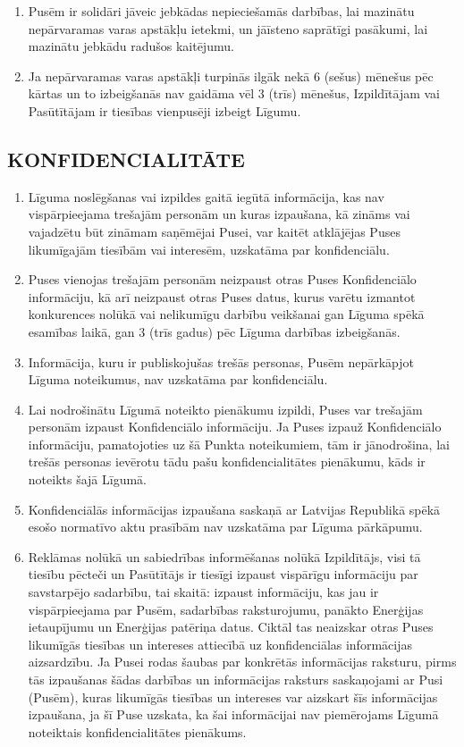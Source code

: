 \begin{multicols}{2}
\begin{enumerate}
	\item Pusēm ir solidāri jāveic jebkādas nepieciešamās darbības, lai mazinātu nepārvaramas varas apstākļu ietekmi, un jāīsteno saprātīgi pasākumi, lai mazinātu jebkādu radušos kaitējumu.
	\item Ja nepārvaramas varas apstākļi turpinās ilgāk nekā 6 (sešus) mēnešus pēc kārtas un to izbeigšanās nav gaidāma vēl 3 (trīs) mēnešus, Izpildītājam vai Pasūtītājam ir tiesības vienpusēji izbeigt Līgumu.
\end{enumerate}

\subsection{KONFIDENCIALITĀTE}
\begin{enumerate}
	\item Līguma noslēgšanas vai izpildes gaitā iegūtā informācija, kas nav vispārpieejama trešajām personām un kuras izpaušana, kā zināms vai vajadzētu būt zināmam saņēmējai Pusei, var kaitēt atklājējas Puses likumīgajām tiesībām vai interesēm, uzskatāma par konfidenciālu.
	\item Puses vienojas trešajām personām neizpaust otras Puses Konfidenciālo informāciju, kā arī neizpaust otras Puses datus, kurus varētu izmantot konkurences nolūkā vai nelikumīgu darbību veikšanai gan Līguma spēkā esamības laikā, gan 3 (trīs gadus) pēc Līguma darbības izbeigšanās.
	\item Informācija, kuru ir publiskojušas trešās personas, Pusēm nepārkāpjot Līguma noteikumus, nav uzskatāma par konfidenciālu.
	\item Lai nodrošinātu Līgumā noteikto pienākumu izpildi, Puses var trešajām personām izpaust Konfidenciālo informāciju. Ja Puses izpauž Konfidenciālo informāciju, pamatojoties uz šā Punkta noteikumiem, tām ir jānodrošina, lai trešās personas ievērotu tādu pašu konfidencialitātes pienākumu, kāds ir noteikts šajā Līgumā.
	\item Konfidenciālās informācijas izpaušana saskaņā ar Latvijas Republikā spēkā esošo normatīvo aktu prasībām nav uzskatāma par Līguma pārkāpumu.
	\item Reklāmas nolūkā un sabiedrības informēšanas nolūkā Izpildītājs, visi tā tiesību pēcteči un Pasūtītājs ir tiesīgi izpaust vispārīgu informāciju par savstarpējo sadarbību, tai skaitā: izpaust informāciju, kas jau ir vispārpieejama par Pusēm, sadarbības raksturojumu, panākto Enerģijas ietaupījumu un Enerģijas patēriņa datus. Ciktāl tas neaizskar otras Puses likumīgās tiesības un intereses attiecībā uz konfidenciālas informācijas aizsardzību. Ja Pusei rodas šaubas par konkrētās informācijas raksturu, pirms tās izpaušanas šādas darbības un informācijas raksturs saskaņojami ar Pusi (Pusēm), kuras likumīgās tiesības un intereses var aizskart šīs informācijas izpaušana, ja šī Puse uzskata, ka šai informācijai nav piemērojams Līgumā noteiktais konfidencialitātes pienākums.

\end{enumerate}
\end{multicols}
